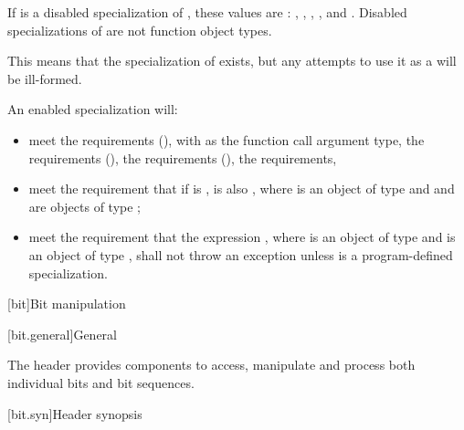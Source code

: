 \pnum
If  is a disabled specialization of ,
these values are :
,
,
,
, and
.
Disabled specializations of 
are not function object types.
\begin{note}
This means that the specialization of  exists, but
any attempts to use it as a  will be ill-formed.
\end{note}

\pnum
An enabled specialization  will:
\begin{itemize}
\item meet the  requirements (),
with  as the function
call argument type, the  requirements (),
the  requirements (),
the  requirements,
\item meet the requirement that if  is ,  is
also , where  is an object of type  and  and 
are objects of type ;
\item meet the requirement that the expression , where 
is an object of type  and  is an object of type
, shall not throw an exception unless  is a
program-defined specialization.
\end{itemize}

[bit]{Bit manipulation}

[bit.general]{General}

\pnum
The header  provides components to access,
manipulate and process both individual bits and bit sequences.

[bit.syn]{Header  synopsis}

